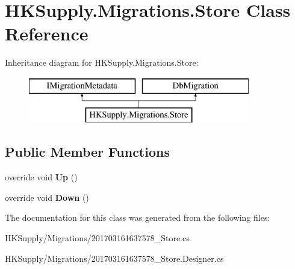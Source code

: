 \hypertarget{class_h_k_supply_1_1_migrations_1_1_store}{}\section{H\+K\+Supply.\+Migrations.\+Store Class Reference}
\label{class_h_k_supply_1_1_migrations_1_1_store}
Inheritance diagram for H\+K\+Supply.\+Migrations.\+Store\+:\begin{figure}[H]
\begin{center}
\leavevmode
\includegraphics[height=2.000000cm]{class_h_k_supply_1_1_migrations_1_1_store}
\end{center}
\end{figure}
\subsection*{Public Member Functions}
\begin{DoxyCompactItemize}
\item 
\mbox{\label{class_h_k_supply_1_1_migrations_1_1_store_a4ac6b4c201fa684a5d43e3b769516879}} 
override void {\bfseries Up} ()
\item 
\mbox{\label{class_h_k_supply_1_1_migrations_1_1_store_a76e74fe59a1b13c891f6f890816bee7e}} 
override void {\bfseries Down} ()
\end{DoxyCompactItemize}


The documentation for this class was generated from the following files\+:\begin{DoxyCompactItemize}
\item 
H\+K\+Supply/\+Migrations/201703161637578\+\_\+\+Store.\+cs\item 
H\+K\+Supply/\+Migrations/201703161637578\+\_\+\+Store.\+Designer.\+cs\end{DoxyCompactItemize}
